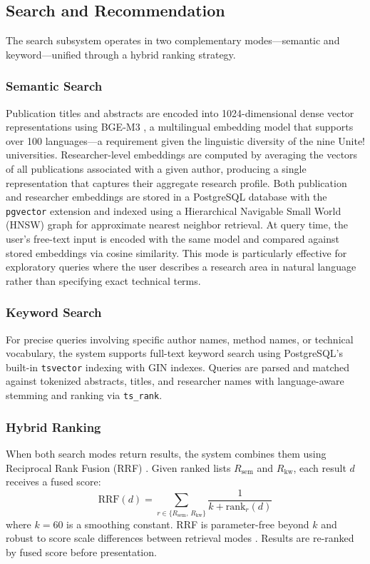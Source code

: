 \documentclass[sigconf, nonacm]{acmart}
\begin{document}
\subsection{Search and Recommendation}
\label{sec:search}

The search subsystem operates in two complementary modes---semantic and keyword---unified through a hybrid ranking strategy.

\subsubsection*{Semantic Search}
Publication titles and abstracts are encoded into 1024-dimensional dense vector representations using BGE-M3 \cite{chen2024bgem3}, a multilingual embedding model that supports over 100 languages---a requirement given the linguistic diversity of the nine Unite! universities. Researcher-level embeddings are computed by averaging the vectors of all publications associated with a given author, producing a single representation that captures their aggregate research profile. Both publication and researcher embeddings are stored in a PostgreSQL database with the \texttt{pgvector} extension \cite{pgvector2024} and indexed using a Hierarchical Navigable Small World (HNSW) graph \cite{malkov2020hnsw} for approximate nearest neighbor retrieval. At query time, the user's free-text input is encoded with the same model and compared against stored embeddings via cosine similarity. This mode is particularly effective for exploratory queries where the user describes a research area in natural language rather than specifying exact technical terms.

\subsubsection*{Keyword Search}
For precise queries involving specific author names, method names, or technical vocabulary, the system supports full-text keyword search using PostgreSQL's built-in \texttt{tsvector} indexing with GIN indexes. Queries are parsed and matched against tokenized abstracts, titles, and researcher names with language-aware stemming and ranking via \texttt{ts\_rank}.

\subsubsection*{Hybrid Ranking}
When both search modes return results, the system combines them using Reciprocal Rank Fusion (RRF) \cite{cormack2009rrf}. Given ranked lists $R_{\text{sem}}$ and $R_{\text{kw}}$, each result $d$ receives a fused score:
\begin{equation}
\text{RRF}(d) = \sum_{r \in \{R_{\text{sem}},\, R_{\text{kw}}\}} \frac{1}{k + \text{rank}_r(d)}
\end{equation}
where $k=60$ is a smoothing constant. RRF is parameter-free beyond $k$ and robust to score scale differences between retrieval modes \cite{cormack2009rrf}. Results are re-ranked by fused score before presentation.
\end{document}
